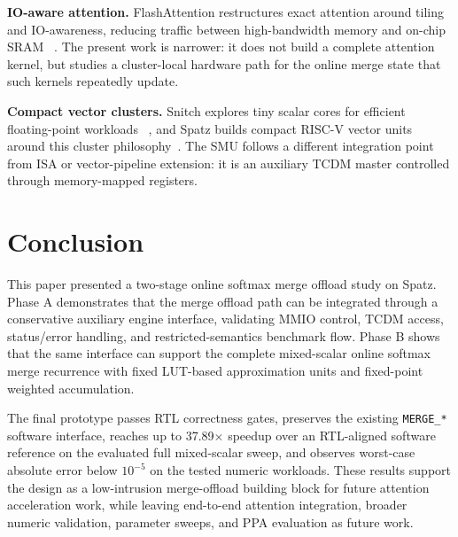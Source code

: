 \documentclass[conference]{IEEEtran}
\begin{document}
\textbf{IO-aware attention.}
FlashAttention restructures exact attention around tiling and IO-awareness,
reducing traffic between high-bandwidth memory and on-chip SRAM
~\cite{flashattention2022}. The present work is narrower: it does not build a
complete attention kernel, but studies a cluster-local hardware path for the
online merge state that such kernels repeatedly update.

\textbf{Compact vector clusters.}
Snitch explores tiny scalar cores for efficient floating-point workloads
~\cite{snitch2020}, and Spatz builds compact RISC-V vector units around this
cluster philosophy~\cite{spatz2023}. The SMU follows a different integration
point from ISA or vector-pipeline extension: it is an auxiliary TCDM master
controlled through memory-mapped registers.

\section{Conclusion}

This paper presented a two-stage online softmax merge offload study on Spatz.
Phase A demonstrates that the merge offload path can be integrated through a
conservative auxiliary engine interface, validating MMIO control, TCDM access,
status/error handling, and restricted-semantics benchmark flow. Phase B shows
that the same interface can support the complete mixed-scalar online softmax
merge recurrence with fixed LUT-based approximation units and fixed-point
weighted accumulation.

The final prototype passes RTL correctness gates, preserves the existing
\texttt{MERGE\_*} software interface, reaches up to 37.89$\times$ speedup over
an RTL-aligned software reference on the evaluated full mixed-scalar sweep,
and observes worst-case absolute error below $10^{-5}$ on the tested numeric
workloads. These results support the design as a low-intrusion
merge-offload building block for future attention acceleration work, while
leaving end-to-end attention integration, broader numeric validation,
parameter sweeps, and PPA evaluation as future work.



\end{document}
